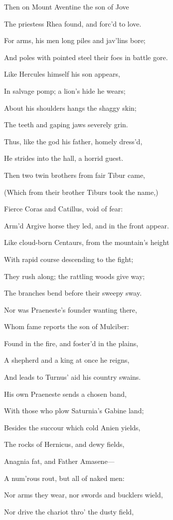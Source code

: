 Then on Mount Aventine the son of Jove

The priestess Rhea found, and forc’d to love.

For arms, his men long piles and jav’lins bore;

And poles with pointed steel their foes in battle gore.

Like Hercules himself his son appears,

In salvage pomp; a lion’s hide he wears;

About his shoulders hangs the shaggy skin;

The teeth and gaping jaws severely grin.

Thus, like the god his father, homely dress’d,

He strides into the hall, a horrid guest.

Then two twin brothers from fair Tibur came,

(Which from their brother Tiburs took the name,)

Fierce Coras and Catillus, void of fear:

Arm’d Argive horse they led, and in the front appear.

Like cloud-born Centaurs, from the mountain’s height

With rapid course descending to the fight;

They rush along; the rattling woods give way;

The branches bend before their sweepy sway.

Nor was Praeneste’s founder wanting there,

Whom fame reports the son of Mulciber:

Found in the fire, and foster’d in the plains,

A shepherd and a king at once he reigns,

And leads to Turnus’ aid his country swains.

His own Praeneste sends a chosen band,

With those who plow Saturnia’s Gabine land;

Besides the succour which cold Anien yields,

The rocks of Hernicus, and dewy fields,

Anagnia fat, and Father Amasene—

A num’rous rout, but all of naked men:

Nor arms they wear, nor swords and bucklers wield,

Nor drive the chariot thro’ the dusty field,

